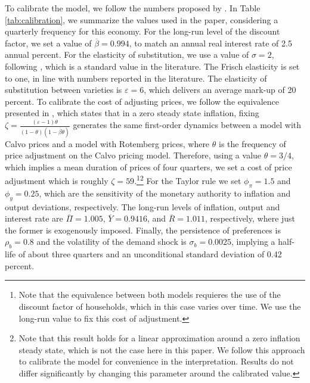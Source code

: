 \documentclass[11pt]{article}
\numberwithin{equation}{section}
\begin{document}
To calibrate the model, we follow the numbers proposed by \cite{Fernandez-VillaverdeEtAl2015}. In Table \ref{tab:calibration}, we summarize the values used in the paper, considering a quarterly frequency for this economy. For the long-run level of the discount factor, we set a value of $\overline{\beta}=0.994$, to match an annual real interest rate of 2.5 annual percent. For the elasticity of substitution, we use a value of $\sigma=2$, following \cite{Gali2015}, which is a standard value in the literature. The Frisch elasticity is set to one, in line with numbers reported in the literature. The elasticity of substitution between varieties is $\varepsilon=6$, which delivers an average mark-up of 20 percent. To calibrate the cost of adjusting prices, we follow the equivalence presented in \cite{AscariEtAl2012}, which states that in a zero steady state inflation, fixing $\zeta=\frac{(\varepsilon-1)\theta}{(1-\theta)(1-\overline{\beta}\theta)}$ generates the same first-order dynamics between a model with Calvo prices and a model with Rotemberg prices, where $\theta$ is the frequency of price adjustment on the Calvo pricing model. Therefore, using a value $\theta=3/4$, which implies a mean duration of prices of four quarters, we set a cost of price adjustment which is roughly $\zeta=59$.\footnote{Note that the equivalence between both models requieres the use of the discount factor of households, which in this case varies over time. We use the long-run value to fix this cost of adjustment.}\footnote{Note that this result holds for a linear approximation around a zero inflation steady state, which is not the case here in this paper. We follow this approach to calibrate the model for convenience in the interpretation. Results do not differ significantly by changing this parameter around the calibrated value.} For the Taylor rule we set $\phi_{\pi}=1.5$ and $\phi_{y}=0.25$, which are the sensitivity of the monetary authority to inflation and output deviations, respectively. The long-run levels of inflation, output and interest rate are $\overline\Pi=1.005$, $\overline Y=0.9416$, and $\overline R=1.011$, respectively, where just the former is exogenously imposed. Finally, the persistence of preferences is $\rho_b=0.8$ and the volatility of the demand shock is $\sigma_b=0.0025$, implying a half-life of about three quarters and an unconditional standard deviation of 0.42 percent. 
\end{document}
